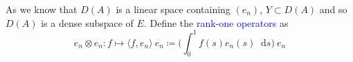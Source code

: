 \documentclass[12pt, reqno]{amsart}
\newcommand{\1}{\mathbbm 1}
\newcommand*\diff{\mathop{}\!\mathrm{d}}
\theoremstyle{plain}
\theoremstyle{definition}
\newcommand{\navy}[1]{\textcolor{blue}{#1}}
\begin{document}
As we know that $D(A)$ is a linear space containing $(e_n)$, $Y\subset D(A)$ and so $D(A)$ is a dense subspace of $E.$ Define the \navy{rank-one operators} as
\begin{equation*}
e_n\otimes e_n\colon f\mapsto \big \langle f,e_n \big \rangle\ e_n\coloneq \Big (\int_{0}^{1}f(s)e_n(s)\diff s\Big)\ e_n
\end{equation*}

\newpage


\end{document}
